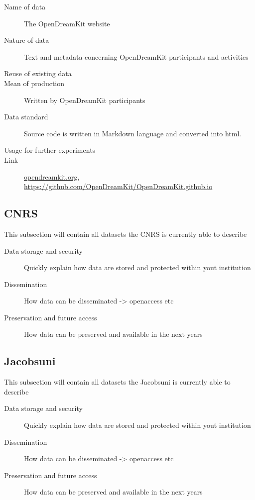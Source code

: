 \documentclass[12pt]{amsbook}
\begin{document}
\begin{enumerate}
\begin{description}
\item[Name of data] The OpenDreamKit website
\item[Nature of data] Text and metadata concerning OpenDreamKit participants and activities
\item[Reuse of existing data]
\item[Mean of production] Written by OpenDreamKit participants
\item[Data standard] Source code is written in Markdown language and converted into html.
\item [Usage for further experiments]
\item [Link] \href{http://opendreamkit.org/}{opendreamkit.org}, \href{https://github.com/OpenDreamKit/OpenDreamKit.github.io}{https://github.com/OpenDreamKit/OpenDreamKit.github.io}
\end{description}

\end{enumerate}

\subsection{CNRS}

This subsection will contain all datasets the CNRS is currently able to describe
\begin{description}
\item[Data storage and security] Quickly explain how data are stored and protected within yout institution
\item[Dissemination] How data can be disseminated -> openaccess etc
\item[Preservation and future access] How data can be preserved and available in the next years
\end{description}


\subsection{Jacobsuni}



This subsection will contain all datasets the Jacobsuni is currently able to describe
\begin{description}
\item[Data storage and security] Quickly explain how data are stored and protected within yout institution
\item[Dissemination] How data can be disseminated -> openaccess etc
\item[Preservation and future access] How data can be preserved and available in the next years
\end{description}
\end{document}
